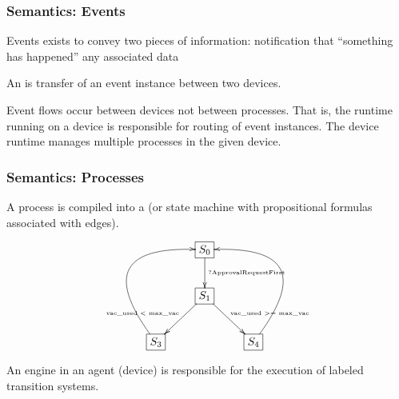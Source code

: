 \documentclass{beamer}
\begin{document}
\begin{frame}
\frametitle{Semantics: Events}

Events exists to convey two pieces of information:
  \bit
  \w notification that ``something has happened''
  \w any associated data
  \eit

An  is transfer of an event instance between two devices.

\vspace*{0.3cm}

Event flows occur between devices not between processes. That is, the 
runtime running on a device is responsible for routing of event instances. 
The device runtime manages multiple processes in the given device.
\end{frame}


\begin{frame}
\frametitle{Semantics: Processes}

A process is compiled into a  (or state machine
with propositional formulas associated with edges). 

\vspace*{0.4cm}

\[\xymatrix@+0.1cm{
  & *+[F]\txt{$S_0$} \ar[d]^{\txt{\tiny{?ApprovalRequestFirst}}} &\\ 
 & *+[F]\txt{$S_1$} \ar[dl]_{\txt{\tiny vac\_used $<$ max\_vac}}
  \ar[dr]^{\txt{\tiny vac\_used $>=$ max\_vac}} & \\
*+[F]\txt{$S_3$} \ar@/^12ex/[uur] & & *+[F]\txt{$S_4$}  \ar@/_12ex/[uul]
}\]


\vspace*{0.4cm}

An engine in an agent (device) is responsible for the execution of labeled
transition systems. 


\end{frame}
\end{document}
